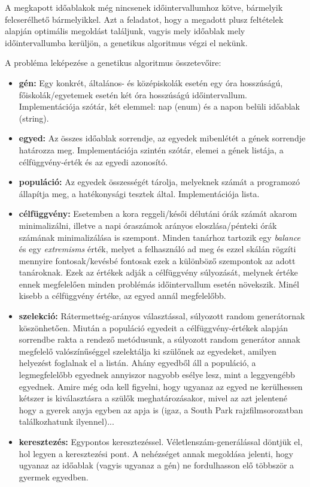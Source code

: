 A megkapott időablakok még nincsenek időintervallumhoz kötve, bármelyik felcserélhető bármelyikkel. Azt a feladatot, hogy a megadott plusz feltételek alapján optimális megoldást találjunk, vagyis mely időablak mely időintervallumba kerüljön, a genetikus algoritmus végzi el nekünk.


\noindent A probléma leképezése a genetikus algoritmus összetevőire:

\begin{itemize}
	\item \textbf{gén:} Egy konkrét, általános- és középiskolák esetén egy óra hosszúságú, 	          főiskolák/egyetemek esetén két óra hosszúságú időintervallum. Implementációja szótár, két elemmel: nap (enum) és a napon belüli időablak (string).
	\item \textbf{egyed:} Az összes időablak sorrendje, az egyedek mibenlétét a gének sorrendje határozza meg. Implementációja szintén szótár, elemei a gének listája, a cél\-függ\-vény-érték és az
	egyedi azonosító.
	\item \textbf{populáció:} Az egyedek összességét tárolja, melyeknek számát a programozó állapítja meg, a hatékonysági tesztek által. Implementációja lista.
	\item \textbf{célfüggvény:} Esetemben a kora reggeli/késői délutáni órák számát akarom minimalizálni, illetve a napi óraszámok arányos eloszlása/pénteki órák számának minimalizálása is szempont. Minden tanárhoz tartozik egy \textsl{balance} és egy \textsl{extremisms} érték,
	melyet a felhasználó ad meg és ezzel skálán rögzíti mennyire fontosak/kevésbé fontosak ezek a különböző szempontok az adott tanároknak. Ezek az értékek adják a célfüggvény súlyozását, melynek értéke ennek megfelelően minden problémás időintervallum esetén növekszik. Minél kisebb a célfüggvény értéke, az egyed annál megfelelőbb.
	\item \textbf{szelekció:} Rátermettség-arányos választással, súlyozott random generátornak köszönhetően. Miután a populáció egyedeit a célfüggvény-értékek alapján sorrendbe rakta a rendező metódusunk, a súlyozott random generátor annak megfelelő valószínűséggel szelektálja ki szülőnek az egyedeket, amilyen helyezést foglalnak el a listán. Ahány egyedből áll a populáció, a legmegfelelőbb egyednek annyiszor nagyobb esélye lesz, mint a leggyengébb egyednek. Amire még oda kell figyelni, hogy ugyanaz az egyed ne kerülhessen kétszer is kiválasztásra a szülők meghatározásakor, mivel az azt jelentené hogy a gyerek anyja egyben az apja is (igaz, a South Park rajzfilmsorozatban találkozhatunk ilyennel)...
	\item \textbf{keresztezés:} Egypontos keresztezéssel. Véletlenszám-generálással döntjük el, hol legyen a keresztezési pont. A nehézséget annak megoldása jelenti, hogy ugyanaz az időablak (vagyis ugyanaz a gén) ne fordulhasson elő többször a gyermek egyedben.
\end{itemize}


